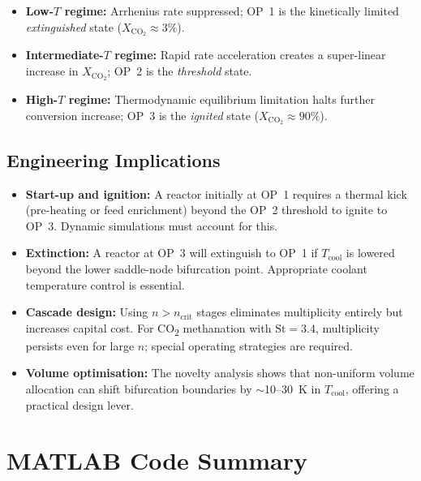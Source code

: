 \documentclass[11pt,a4paper]{article}
\newcommand{\Xco}{X_{\mathrm{CO_2}}}
\newcommand{\Tcool}{T_{\mathrm{cool}}}
\newcommand{\St}{\mathrm{St}}
\begin{document}
\begin{itemize}[itemsep=1pt,leftmargin=1.6em]
  \item \textbf{Low-$T$ regime:} Arrhenius rate suppressed; OP~1 is the
        kinetically limited \textit{extinguished} state ($\Xco \approx 3\%$).
  \item \textbf{Intermediate-$T$ regime:} Rapid rate acceleration creates
        a super-linear increase in $\Xco$; OP~2 is the \textit{threshold} state.
  \item \textbf{High-$T$ regime:} Thermodynamic equilibrium limitation halts
        further conversion increase; OP~3 is the \textit{ignited} state
        ($\Xco \approx 90\%$).
\end{itemize}

\subsection{Engineering Implications}

\begin{itemize}[itemsep=1pt,leftmargin=1.6em]
  \item \textbf{Start-up and ignition:} A reactor initially at OP~1 requires
        a thermal kick (pre-heating or feed enrichment) beyond the OP~2 threshold
        to ignite to OP~3.  Dynamic simulations must account for this.
  \item \textbf{Extinction:} A reactor at OP~3 will extinguish to OP~1 if
        $\Tcool$ is lowered beyond the lower saddle-node bifurcation point.
        Appropriate coolant temperature control is essential.
  \item \textbf{Cascade design:} Using $n > n_\mathrm{crit}$ stages
        eliminates multiplicity entirely but increases capital cost.
        For CO\textsubscript{2} methanation with $\St=3.4$, multiplicity
        persists even for large $n$; special operating strategies are required.
  \item \textbf{Volume optimisation:} The novelty analysis shows that
        non-uniform volume allocation can shift bifurcation boundaries by
        $\sim$10--30~K in $\Tcool$, offering a practical design lever.
\end{itemize}

\section{MATLAB Code Summary}
\label{sec:code}
\end{document}
